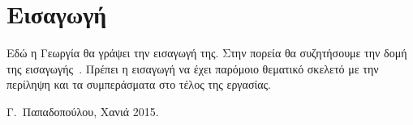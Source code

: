 \chapter*{Εισαγωγή}

Εδώ η Γεωργία θα γράψει την εισαγωγή της. Στην πορεία θα συζητήσουμε
την δομή της εισαγωγής~\cite{Kourounis2014}. 
Πρέπει η εισαγωγή να έχει παρόμοιο θεματικό σκελετό με την~\cite{Jansen:book,Chen:2012} 
περίληψη και τα συμπεράσματα στο τέλος της εργασίας.




\bigskip

\begin{flushright}
\begin{minipage}{150pt}
Γ.\ Παπαδοπούλου, Χανιά 2015.
\end{minipage}
\end{flushright}



\endinput
